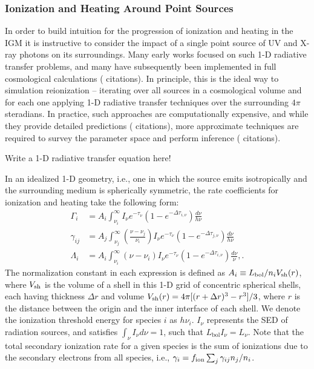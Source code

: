 \subsubsection{Ionization and Heating Around Point Sources} \label{sec:smallscales}
In order to build intuition for the progression of ionization and heating in the IGM it is instructive to consider the impact of a single point source of UV and X-ray photons on its surroundings. Many early works focused on such 1-D radiative transfer problems, and many have subsequently been implemented in full cosmological calculations ({\color{red} citations}). In principle, this is the ideal way to simulation reionization -- iterating over all sources in a cosmological volume and for each one applying 1-D radiative transfer techniques over the surrounding $4\pi$ steradians. In practice, such approaches are computationally expensive, and while they provide detailed predictions ({\color{red} citations}), more approximate techniques are required to survey the parameter space and perform inference ({\color{red} citations}).

{\color{red} Write a 1-D radiative transfer equation here!}

In an idealized 1-D geometry, i.e., one in which the source emits isotropically and the surrounding medium is spherically symmetric, the rate coefficients for ionization and heating take the following form:
\begin{align}
    \Gamma_i & = A_i \int_{\nu_i}^{\infty} I_{\nu} e^{-\tau_{\nu}} \left(1 - e^{-\Delta \tau_{i,\nu}}\right) \frac{d\nu}{h\nu} \label{eq:PhotoIonizationRate} \\
    \gamma_{ij} & = A_j \int_{\nu_j}^{\infty} \left(\frac{\nu - \nu_j}{\nu_i}\right) I_{\nu} e^{-\tau_{\nu}} \left(1 - e^{-\Delta \tau_{j,\nu}}\right) \frac{d\nu}{h\nu} \label{eq:SecondaryIonizationRate} \\
    \Lambda_i & = A_i \int_{\nu_i}^{\infty} (\nu - \nu_i) I_{\nu} e^{-\tau_{\nu}} \left(1 - e^{-\Delta \tau_{i,\nu}}\right) \frac{d\nu}{\nu} , \label{eq:HeatingRate} .
\end{align}
The normalization constant in each expression is defined as $A_i \equiv L_{\mathrm{bol}}/n_i V_{\mathrm{sh}}(r)$, where $V_{\mathrm{sh}}$ is the volume of a shell in this 1-D grid of concentric spherical shells, each having thickness $\Delta r$ and volume $V_{\mathrm{sh}}(r) = 4 \pi [(r + \Delta r)^3 - r^3] / 3$, where $r$ is the distance between the origin and the inner interface of each shell. We denote the ionization threshold energy for species $i$ as $h\nu_i$. $I_{\nu}$ represents the SED of radiation sources, and satisfies $\int_{\nu} I_{\nu} d\nu = 1$, such that $L_{\mathrm{bol}} I_{\nu} = L_{\nu}$. Note that the total secondary ionization rate for a given species is the sum of ionizations due to the secondary electrons from all species, i.e., $\gamma_i = f_{\text{ion}} \sum_j \gamma_{ij} n_j / n_i$.

